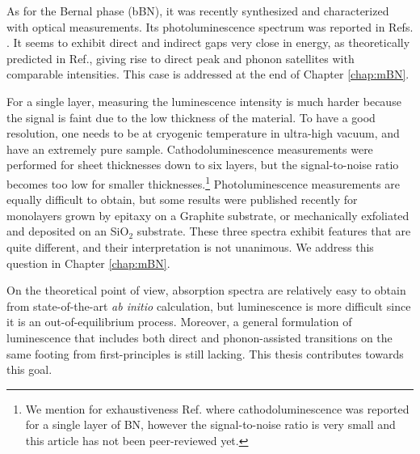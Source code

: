 As for the Bernal phase (\acrshort{bBN}), it was recently synthesized and characterized with optical measurements. Its photoluminescence spectrum was reported in Refs. \cite{rousseau2022bernal,rousseau2022phonon}. It seems to exhibit direct and indirect gaps very close in energy, as theoretically predicted in Ref.\cite{sponza2018direct}, giving rise to direct peak and phonon satellites with comparable intensities. This case is addressed at the end of Chapter \ref{chap:mBN}.


For a single layer, measuring the luminescence intensity is much harder because the signal is faint due to the low thickness of the material. To have a good resolution, one needs to be at cryogenic temperature in ultra-high vacuum, and have an extremely pure sample.
Cathodoluminescence measurements were performed for sheet thicknesses down to six layers,\cite{schue2016dimensionality} but the signal-to-noise ratio becomes too low for smaller thicknesses.\footnote{We mention for exhaustiveness Ref. \cite{shima2023cathodoluminescence} where cathodoluminescence was reported for a single layer of BN, however the signal-to-noise ratio is very small and this article has not been peer-reviewed yet.}
Photoluminescence measurements are equally difficult to obtain, but some results were published recently for monolayers grown by epitaxy on a Graphite substrate,\cite{elias2019direct,wang2022scalable} or mechanically exfoliated and deposited on an SiO$_2$ substrate.\cite{rousseau2021monolayer} These three spectra exhibit features that are quite different, and their interpretation is not unanimous. We address this question in Chapter \ref{chap:mBN}. 

On the theoretical point of view, absorption spectra are relatively easy to obtain from state-of-the-art \textit{ab initio} calculation, but luminescence is more difficult since it is an out-of-equilibrium process. Moreover, a general formulation of luminescence that includes both direct and phonon-assisted transitions on the same footing from first-principles is still lacking. This thesis contributes towards this goal.


